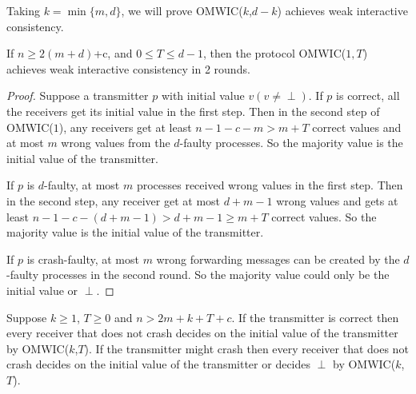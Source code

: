 Taking $k= \min \{ m,d \}$, we will prove OMWIC($k$,$d-k$) achieves weak
interactive consistency.

\begin{lemma}\label{crash:basic}
  If $n \geqslant 2 ( m+d )$+c, and $0 \leqslant T \leqslant d-1$, then the
  protocol OMWIC($1,T$) achieves weak interactive consistency in 2 rounds.
\end{lemma}

\begin{proof}
  Suppose a transmitter $p$ with initial value $v ( v \neq \perp )$. If $p$ is
  correct, all the receivers get its initial value in the first step. Then in
  the second step of OMWIC($1$), any receivers get at least $n-1-c-m>m+T$
  correct values and at most $m$ wrong values from the $d$-faulty processes.
  So the majority value is the initial value of the transmitter.
  
  If $p$ is $d$-faulty, at most $m$ processes received wrong values in the
  first step. Then in the second step, any receiver get at most $d+m-1$ wrong
  values and gets at least $n-1-c- ( d+m-1 ) >d+m-1 \geqslant m+T$ correct
  values. So the majority value is the initial value of the transmitter.
  
  If $p$ is crash-faulty, at most $m$ wrong forwarding messages can be created
  by the $d$-faulty processes in the second round. So the majority value could
  only be the initial value or $\perp$.
\end{proof}

\begin{lemma}\label{crash:correct}
  Suppose $k \geqslant 1$, $T \geqslant 0$ and $n>2m+k+T+c$. If the
  transmitter is correct then every receiver that does not crash decides on
  the initial value of the transmitter by OMWIC($k$,$T$). If the transmitter
  might crash then every receiver that does not crash decides on the initial
  value of the transmitter or decides $\perp$ by OMWIC($k$,$T$).
\end{lemma}

